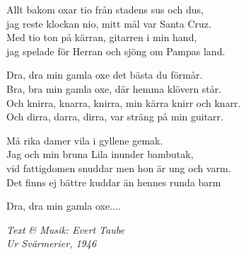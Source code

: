 \vspace{10pt}
Allt bakom oxar tio från stadens sus och dus,\\
jag reste klockan nio, mitt mål var Santa Cruz.\\
Med tio ton på kärran, gitarren i min hand,\\
jag spelade för Herran och sjöng om Pampas land.\par
\vspace{10pt}
Dra, dra min gamla oxe det bästa du förmår.\\
Bra, bra min gamla oxe, där hemma klövern står.\\
Och knirra, knarra, knirra, min kärra knirr och knarr.\\
Och dirra, darra, dirra, var sträng på min guitarr.\par
\vspace{10pt}
Må rika damer vila i gyllene gemak.\\
Jag och min bruna Lila inunder bambutak,\\
vid fattigdomen snuddar men hon är ung och varm.\\
Det finns ej bättre kuddar än hennes runda barm\par
\vspace{10pt}
Dra, dra min gamla oxe....
\par
\vspace{10pt}
{\footnotesize\textit{Text \& Musik: Evert Taube\\Ur Svärmerier, 1946}}
